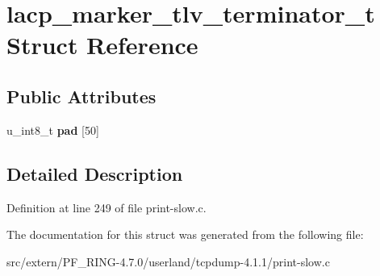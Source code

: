\hypertarget{structlacp__marker__tlv__terminator__t}{
\section{lacp\_\-marker\_\-tlv\_\-terminator\_\-t Struct Reference}
\label{structlacp__marker__tlv__terminator__t}
}
\subsection*{Public Attributes}
\begin{DoxyCompactItemize}
\item 
\hypertarget{structlacp__marker__tlv__terminator__t_a05b443d2ffa0695d1750836960053c00}{
u\_\-int8\_\-t {\bfseries pad} \mbox{[}50\mbox{]}}
\label{structlacp__marker__tlv__terminator__t_a05b443d2ffa0695d1750836960053c00}

\end{DoxyCompactItemize}


\subsection{Detailed Description}


Definition at line 249 of file print-\/slow.c.



The documentation for this struct was generated from the following file:\begin{DoxyCompactItemize}
\item 
src/extern/PF\_\-RING-\/4.7.0/userland/tcpdump-\/4.1.1/print-\/slow.c\end{DoxyCompactItemize}
